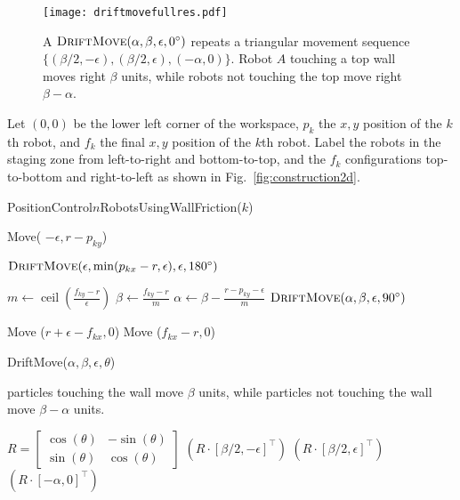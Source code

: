 \begin{figure}
\begin{center}
	\texttt{[image: driftmovefullres.pdf]}
\end{center}
\vspace{-1em}
\caption{\label{fig:driftmove}
A  $\text{\sc DriftMove}(\alpha, \beta, \epsilon,0^\circ)$ repeats a triangular movement sequence $\{ (\beta/2,-\epsilon),(\beta/2,\epsilon),(-\alpha,0)\}$. Robot $A$ touching a top wall moves right $\beta$ units, while robots not touching the top move right $\beta-\alpha$.}
\vspace{-1em}
\end{figure}

Let $(0,0)$ be the lower left corner of the workspace, $p_k$ the $x,y$ position of the $k$th robot, and $f_k$ the final $x,y$ position of the $k$th robot. Label the robots in the staging zone from left-to-right and bottom-to-top, and the $f_k$ configurations top-to-bottom and right-to-left as shown in Fig.~\ref{fig:construction2d}.

\begin{algorithm}
\caption{PositionControl$n$RobotsUsingWallFriction($k$)}\label{alg:PosControlNRobots}
\begin{algorithmic}[1]
\State Move( $-\epsilon, r-p_{ky}$) %


\State $\text{\sc DriftMove}(\epsilon, \min(p_{kx} - r,\epsilon), \epsilon,180^\circ)$    %
\EndWhile

\State $m \gets \operatorname{ceil}(\frac{f_{ky}-r}{\epsilon})$
\State $\beta \gets \frac{f_{ky}-r}{m}$
\State $\alpha \gets \beta - \frac{r - p_{ky}-\epsilon}{m}$
\State $\text{\sc DriftMove}(\alpha, \beta, \epsilon,90^\circ)$    %
\EndFor

\State Move ($r+\epsilon-f_{kx}, 0$)  %
\State Move ($f_{kx}-r, 0$)  

\end{algorithmic}
\end{algorithm}


\begin{algorithm}
\caption{ {\sc DriftMove}($\alpha,\beta,\epsilon,\theta$)
}\label{alg:DriftMove}
particles touching the wall move $\beta$ units, while particles not touching the wall move $\beta-\alpha$ units.
\begin{algorithmic}[1]
\State $R = \begin{bmatrix} \cos(\theta) & -\sin(\theta) \\
 \sin(\theta) & \cos(\theta)  \end{bmatrix}$
$(R \cdot [\beta/2,-\epsilon]^\top)$ 
$(R \cdot [\beta/2,\epsilon]^\top)$ 
$(R \cdot [-\alpha,0]^\top)$ 
\end{algorithmic}
\end{algorithm}


